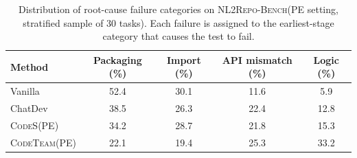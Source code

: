 \documentclass[format=acmsmall, review=false, screen=true]{acmart}
\newcommand{\tool}{\textsc{CodeTeam}\xspace}
\newcommand{\codes}{\textsc{CodeS}\xspace}
\newcommand{\nlrepobench}{\textsc{NL2Repo-Bench}\xspace}
\begin{document}
\begin{table}[t]
\centering
\small
\caption{Distribution of root-cause failure categories on \nlrepobench (PE setting, stratified sample of 30 tasks). Each failure is assigned to the earliest-stage category that causes the test to fail.}
\label{tab:nl2repo-errors}
\begin{tabular}{@{}lcccc@{}}
\toprule
Method & Packaging (\%) & Import (\%) & API mismatch (\%) & Logic (\%) \\
\midrule
Vanilla & 52.4 & 30.1 & 11.6 & 5.9 \\
ChatDev & 38.5 & 26.3 & 22.4 & 12.8 \\
\codes (PE) & 34.2 & 28.7 & 21.8 & 15.3 \\
\tool (PE) & 22.1 & 19.4 & 25.3 & 33.2 \\
\bottomrule
\end{tabular}
\end{table}
\end{document}
